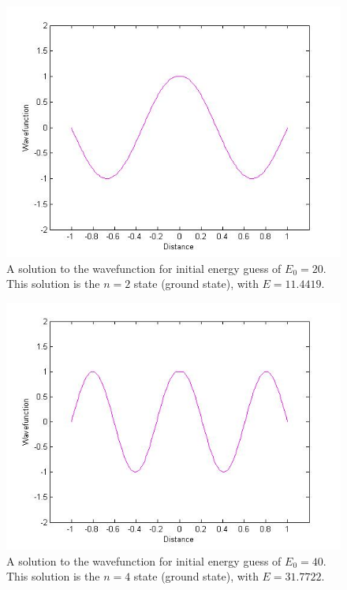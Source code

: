 \documentclass[12pt]{article}                  %
\begin{document}
\begin{figure}[H]
\centering
\includegraphics[scale=0.45]{aogle_final_n_2.jpg}
\caption{A solution to the wavefunction for initial energy guess of $E_{0} = 20$. This solution is the $n = 2$ state (ground state), with $E = 11.4419$.}
\label{wavefunction n = 2}
\end{figure}

\begin{figure}[H]
\centering
\includegraphics[scale=0.45]{aogle_final_n_4.jpg}
\caption{A solution to the wavefunction for initial energy guess of $E_{0} = 40$. This solution is the $n = 4$ state (ground state), with $E = 31.7722$.}
\label{wavefunction n = 4}
\end{figure}
\end{document}
